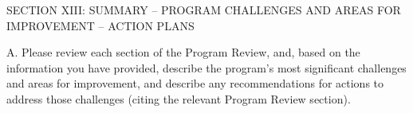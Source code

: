 SECTION XIII: SUMMARY – PROGRAM CHALLENGES AND AREAS FOR IMPROVEMENT – ACTION PLANS

A. Please review each section of the Program Review, and, based on the information you have provided, describe the program’s most significant challenges and areas for improvement, and describe any recommendations for actions to address those challenges (citing the relevant Program Review section).